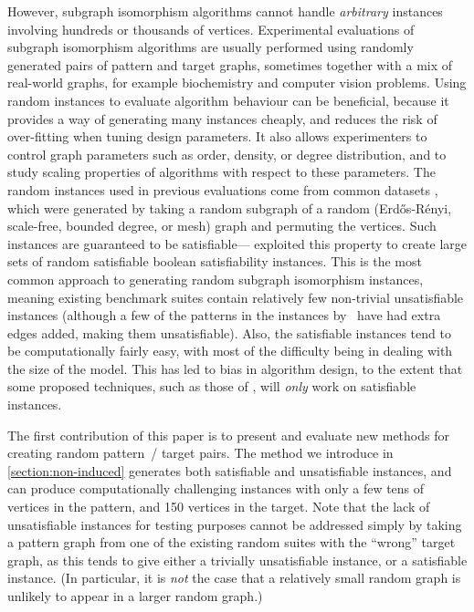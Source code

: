 \documentclass[twoside,11pt]{article}
\begin{document}
However, subgraph isomorphism algorithms cannot handle \emph{arbitrary} instances involving hundreds
or thousands of vertices. Experimental evaluations of subgraph isomorphism algorithms are usually
performed using randomly generated pairs of pattern and target graphs, sometimes together with a mix of real-world graphs,
for example biochemistry and computer vision problems. Using random instances to evaluate
algorithm behaviour can be beneficial, because it provides a way of generating many instances
cheaply, and reduces the risk of over-fitting when tuning design parameters. It also allows
experimenters to control graph parameters such as order, density, or degree distribution, and to
study scaling properties of algorithms with respect to these parameters.  The random instances used
in previous evaluations come from common datasets
\cite{DBLP:journals/prl/SantoFSV03,DBLP:journals/constraints/ZampelliDS10}, which were generated by
taking a random subgraph of a random (Erd\H{o}s-R\'enyi, scale-free, bounded degree, or mesh) graph
and permuting the vertices. Such instances are guaranteed to be satisfiable---
exploited this property to create large sets of random satisfiable boolean satisfiability instances.
This is the most common approach to generating random subgraph isomorphism instances, meaning
existing benchmark suites contain relatively few non-trivial unsatisfiable instances (although a few
of the patterns in the instances by \citeauthor{DBLP:journals/constraints/ZampelliDS10}\ have had
extra edges added, making them unsatisfiable). Also, the satisfiable instances tend to be
computationally fairly easy, with most of the difficulty being in dealing with the size of the
model. This has led to bias in algorithm design, to the extent that some proposed techniques, such
as those of , will \emph{only} work on satisfiable instances.

The first contribution of this paper is to present and evaluate new methods for creating random
pattern~/ target pairs.  The method we introduce in \cref{section:non-induced} generates both
satisfiable and unsatisfiable instances, and can produce computationally challenging instances with
only a few tens of vertices in the pattern, and 150 vertices in the target. Note that the lack of
unsatisfiable instances for testing purposes cannot be addressed simply by taking a pattern graph
from one of the existing random suites with the ``wrong'' target graph, as this tends to give either
a trivially unsatisfiable instance, or a satisfiable instance. (In particular, it is \emph{not} the
case that a relatively small random graph is unlikely to appear in a larger random graph.)
\end{document}
